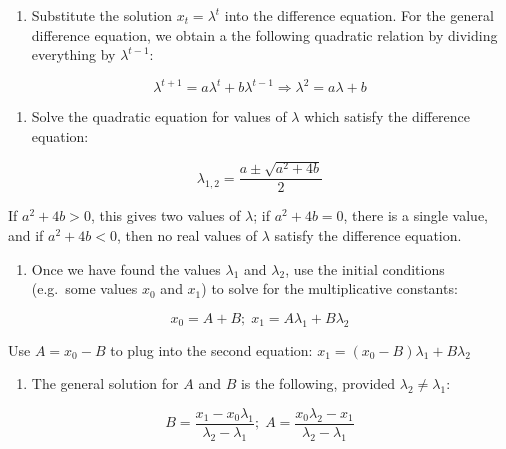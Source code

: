 \documentclass[
  letterpaper,
  DIV=11,
  numbers=noendperiod]{scrreprt}
\providecommand{\tightlist}{%
  \setlength{\itemsep}{0pt}\setlength{\parskip}{0pt}}\usepackage{longtable,booktabs,array}
\begin{document}
\begin{tcolorbox}[enhanced jigsaw, colbacktitle=quarto-callout-tip-color!10!white, leftrule=.75mm, coltitle=black, left=2mm, breakable, opacityback=0, colback=white, toprule=.15mm, opacitybacktitle=0.6, bottomtitle=1mm, colframe=quarto-callout-tip-color-frame, rightrule=.15mm, bottomrule=.15mm, toptitle=1mm, titlerule=0mm, arc=.35mm, title={Outline for solving a second order linear difference equation}]

\begin{enumerate}
\def\labelenumi{\arabic{enumi}.}
\tightlist
\item
  Substitute the solution \(x_t = \lambda^t\) into the difference
  equation. For the general difference equation, we obtain a the
  following quadratic relation by dividing everything by
  \(\lambda^{t-1}\):
\end{enumerate}

\[
\lambda^{t+1} = a \lambda^{t} + b \lambda^{t-1} \Rightarrow \lambda^2 = a\lambda + b
\]

\begin{enumerate}
\def\labelenumi{\arabic{enumi}.}
\setcounter{enumi}{1}
\tightlist
\item
  Solve the quadratic equation for values of \(\lambda\) which satisfy
  the difference equation:
\end{enumerate}

\[
\lambda_{1,2} = \frac{a \pm \sqrt {a^2  + 4b} }{2}
\]

If \(a^2 + 4b > 0\), this gives two values of \(\lambda\); if
\(a^2 + 4b = 0\), there is a single value, and if \(a^2 + 4b < 0\), then
no real values of \(\lambda\) satisfy the difference equation.

\begin{enumerate}
\def\labelenumi{\arabic{enumi}.}
\setcounter{enumi}{2}
\tightlist
\item
  Once we have found the values \(\lambda_1\) and \(\lambda_2\), use the
  initial conditions (e.g.~some values \(x_0\) and \(x_1\)) to solve for
  the multiplicative constants:
\end{enumerate}

\[
x_0 = A + B ; \; x_1 = A\lambda_1 + B\lambda_2
\]

Use \(A = x_0 - B\) to plug into the second equation:
\(x_1 = (x_0 - B) \lambda_1 + B \lambda_2\)

\begin{enumerate}
\def\labelenumi{\arabic{enumi}.}
\setcounter{enumi}{3}
\tightlist
\item
  The general solution for \(A\) and \(B\) is the following, provided
  \(\lambda_2 \neq \lambda_1\):
\end{enumerate}

\[
B = \frac{x_1 -x_0 \lambda_1}{\lambda_2 - \lambda_1}; \; A =  \frac{x_0\lambda_2 - x_1}{\lambda_2 - \lambda_1}
\]

\end{tcolorbox}
\end{document}

